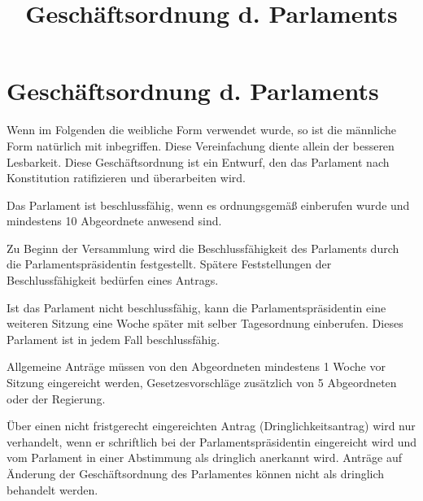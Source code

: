 \documentclass{sasbase}
\begin{document}
\title{Gesch\"{a}ftsordnung d. Parlaments}

\setcounter{secnumdepth}{5}

\mytitle

\parensstyle

\section{Gesch\"{a}ftsordnung d. Parlaments}
Wenn im Folgenden die weibliche Form verwendet wurde, so ist die m\"{a}nnliche Form nat\"{u}rlich mit inbegriffen. Diese Vereinfachung diente allein der besseren Lesbarkeit. Diese Gesch\"{a}ftsordnung ist ein Entwurf, den das Parlament nach Konstitution ratifizieren und \"{u}berarbeiten wird. 
\begin{article}[Beschlussfähigkeit]
	\item Das Parlament ist beschlussfähig, wenn es ordnungsgemäß einberufen wurde und mindestens 10 Abgeordnete anwesend sind.
	\item Zu Beginn der Versammlung wird die Beschlussfähigkeit des Parlaments durch die Parlamentspr\"{a}sidentin festgestellt. Spätere Feststellungen der Beschlussfähigkeit bedürfen eines Antrags.
	\item Ist das Parlament nicht beschlussfähig, kann die Parlamentspr\"{a}sidentin eine weiteren Sitzung eine Woche sp\"{a}ter mit selber Tagesordnung einberufen. Dieses Parlament ist in jedem Fall beschlussfähig.
\end{article}
\begin{article}[Anträge]
	\item Allgemeine Antr\"{a}ge m\"{u}ssen von den Abgeordneten mindestens 1 Woche vor Sitzung eingereicht werden, Gesetzesvorschl\"{a}ge zus\"{a}tzlich von 5 Abgeordneten oder der Regierung.
	\item Über einen nicht fristgerecht eingereichten Antrag (Dringlichkeitsantrag) wird nur verhandelt, wenn er schriftlich bei der Parlamentspr\"{a}sidentin eingereicht wird und vom Parlament in einer Abstimmung als dringlich anerkannt wird. Anträge auf Änderung der Geschäftsordnung des Parlamentes können nicht als dringlich behandelt werden.
\end{article}
\end{document}
